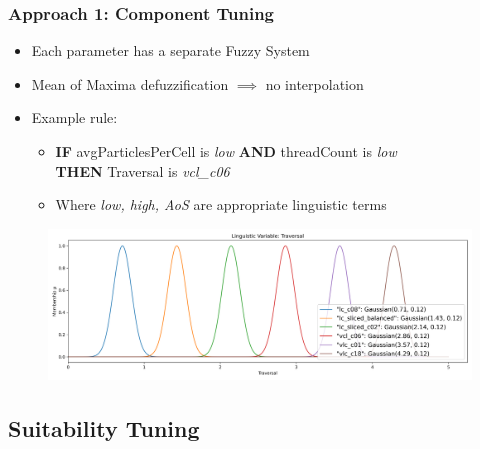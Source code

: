 \documentclass[
	10pt,
	t		%
]{beamer}
\begin{document}
\begin{frame}
	\frametitle{Approach 1: Component Tuning}
	\begin{itemize}
		\item Each parameter has a separate Fuzzy System
		\item Mean of Maxima defuzzification $\implies$ no interpolation
		\item Example rule:
		      \begin{itemize}
			      \item
			            \textbf{IF} avgParticlesPerCell is \textit{low} \textbf{AND} threadCount is \textit{low}\\ \qquad \textbf{THEN} Traversal is \textit{vcl\_c06}
			      \item Where \textit{low, high, AoS} are appropriate linguistic terms
		      \end{itemize}


	\end{itemize}

	\begin{figure}
		\centering
		\includegraphics[width=1\textwidth]{figures/component-linguistic-variable.png}
	\end{figure}

\end{frame}



\subsection{Suitability Tuning}
\end{document}
